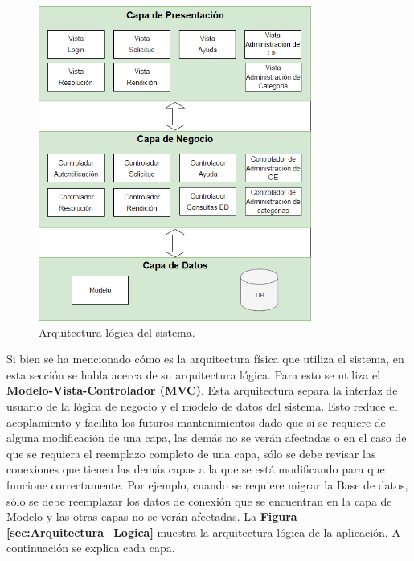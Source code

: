 \begin{figure}[htb]
    \hspace{12mm}
    \includegraphics[width=0.8\textwidth]{Imagenes/Arquitectura_logica.png}
    \caption{\label{fig: Arquitectura_Logica}Arquitectura lógica del sistema.}
\end{figure}

Si bien se ha mencionado cómo es la arquitectura física que utiliza el sistema, en esta sección se habla acerca de su arquitectura lógica. Para esto se utiliza el \textbf{Modelo-Vista-Controlador (MVC)}. Esta arquitectura separa la interfaz de usuario de la lógica de negocio y el modelo de datos del sistema. Esto reduce el acoplamiento y facilita los futuros mantenimientos dado que si se requiere de alguna modificación de una capa, las demás no se verán afectadas o en el caso de que se requiera el reemplazo completo de una capa, sólo se debe revisar las conexiones que tienen las demás capas a la que se está modificando para que funcione correctamente. Por ejemplo, cuando se requiere migrar la Base de datos, sólo se debe reemplazar los datos de conexión que se encuentran en la capa de Modelo y las otras capas no se verán afectadas. La \textbf{Figura \ref{sec:Arquitectura_Logica}} muestra la arquitectura lógica de la aplicación. A continuación se explica cada capa.

